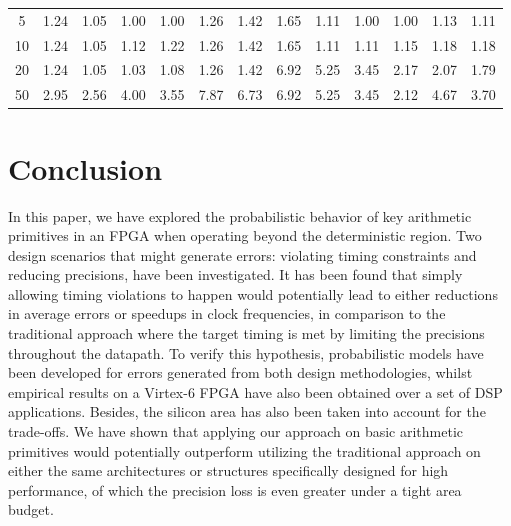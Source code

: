\documentclass[prodmode,acmtrets]{acmsmall} %
\begin{document}
\begin{table}[htbp]
{\begin{tabular}{|c|cc|cc|cc|cc|cc||cc|}
     5    & 1.24&	1.05& 1.00&	1.00& 1.26&   1.42&   1.65&   1.11&	 1.00&    1.00   &1.13    &1.11\\
     10   & 1.24&	1.05& 1.12&	1.22& 1.26&	1.42& 1.65&	1.11& 1.11&	 1.15&    1.18    &1.18\\
     20   & 1.24&	1.05& 1.03&	1.08& 1.26&	1.42& 6.92&	 5.25&   3.45&	 2.17   &2.07    &1.79\\
     50   & 2.95&	2.56& 4.00&	3.55& 7.87&	6.73& 6.92&	 5.25&   3.45&	 2.12	&4.67 &3.70\\
     \hline
   \end{tabular}}
   \normalsize
   \label{Max_Frequency}
 \end{table}

\section{Conclusion}  \label{Section_Conclusion}
In this paper, we have explored the probabilistic behavior of key arithmetic primitives in an FPGA when operating beyond the deterministic region. Two design scenarios that might generate errors: violating timing constraints and reducing precisions, have been investigated. It has been found that simply allowing timing violations to happen would potentially lead to either reductions in average errors or speedups in clock frequencies, in comparison to the traditional approach where the target timing is met by limiting the precisions throughout the datapath. To verify this hypothesis, probabilistic models have been developed for errors generated from both design methodologies, whilst empirical results on a Virtex-6 FPGA have also been obtained over a set of DSP applications. Besides, the silicon area has also been taken into account for the trade-offs. We have shown that applying our approach on basic arithmetic primitives would potentially outperform utilizing the traditional approach on either the same architectures or structures specifically designed for high performance, of which the precision loss is even greater under a tight area budget.
\end{document}
